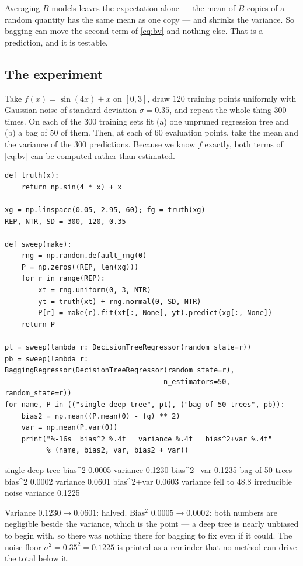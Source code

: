 \documentclass[11pt]{article}
\begin{document}
Averaging $B$ models leaves the expectation alone --- the mean of $B$ copies of
a random quantity has the same mean as one copy --- and shrinks the variance.
So bagging can move the second term of \eqref{eq:bv} and nothing else. That is
a prediction, and it is testable.

\subsection{The experiment}

Take $f(x) = \sin(4x) + x$ on $[0, 3]$, draw $120$ training points uniformly
with Gaussian noise of standard deviation $\sigma = 0.35$, and repeat the
whole thing $300$ times. On each of the $300$ training sets fit (a) one
unpruned regression tree and (b) a bag of $50$ of them. Then, at each of $60$
evaluation points, take the mean and the variance of the $300$ predictions.
Because we know $f$ exactly, both terms of \eqref{eq:bv} can be computed
rather than estimated.

\begin{lstlisting}
def truth(x):
    return np.sin(4 * x) + x

xg = np.linspace(0.05, 2.95, 60); fg = truth(xg)
REP, NTR, SD = 300, 120, 0.35

def sweep(make):
    rng = np.random.default_rng(0)
    P = np.zeros((REP, len(xg)))
    for r in range(REP):
        xt = rng.uniform(0, 3, NTR)
        yt = truth(xt) + rng.normal(0, SD, NTR)
        P[r] = make(r).fit(xt[:, None], yt).predict(xg[:, None])
    return P

pt = sweep(lambda r: DecisionTreeRegressor(random_state=r))
pb = sweep(lambda r: BaggingRegressor(DecisionTreeRegressor(random_state=r),
                                      n_estimators=50, random_state=r))
for name, P in (("single deep tree", pt), ("bag of 50 trees", pb)):
    bias2 = np.mean((P.mean(0) - fg) ** 2)
    var = np.mean(P.var(0))
    print("%-16s  bias^2 %.4f   variance %.4f   bias^2+var %.4f"
          % (name, bias2, var, bias2 + var))
\end{lstlisting}
\begin{codeout}
single deep tree  bias^2 0.0005   variance 0.1230   bias^2+var 0.1235
bag of 50 trees   bias^2 0.0002   variance 0.0601   bias^2+var 0.0603
variance fell to 48.8%
irreducible noise variance 0.1225
\end{codeout}

Variance $0.1230 \to 0.0601$: halved. Bias$^2$ $0.0005 \to 0.0002$: both
numbers are negligible beside the variance, which is the point --- a deep tree
is nearly unbiased to begin with, so there was nothing there for bagging to
fix even if it could. The noise floor $\sigma^2 = 0.35^2 = 0.1225$ is printed
as a reminder that no method can drive the total below it.
\end{document}
